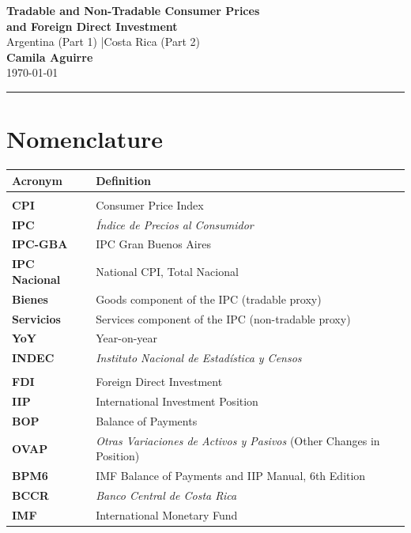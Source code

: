 \documentclass[11pt, a4paper]{article}
\begin{document}

\begin{center}
    {\LARGE\bfseries Tradable and Non-Tradable Consumer Prices\\[4pt]
     and Foreign Direct Investment}\\[8pt]
    {\large Argentina (Part 1) \quad|\quad Costa Rica (Part 2)}\\[6pt]
    {\large\bfseries Camila Aguirre}\\[4pt]
    {\normalsize\color{gray}\today}
\end{center}

\vspace{4pt}
\hrule
\vspace{10pt}

\section*{Nomenclature}

\begin{tabular}{>{\bfseries}p{3.4cm} p{10.8cm}}
    \toprule
    \normalfont\textbf{Acronym} & \textbf{Definition} \\
    \midrule
    \multicolumn{2}{l}{\textit{Part 1 — Argentina}} \\[3pt]
    CPI          & Consumer Price Index \\
    IPC          & \emph{Índice de Precios al Consumidor} \\
    IPC-GBA      & IPC Gran Buenos Aires \\
    IPC Nacional & National CPI, Total Nacional \\
    Bienes       & Goods component of the IPC (tradable proxy) \\
    Servicios    & Services component of the IPC (non-tradable proxy) \\
    YoY          & Year-on-year \\
    INDEC        & \emph{Instituto Nacional de Estadística y Censos} \\[6pt]
    \multicolumn{2}{l}{\textit{Part 2 — Costa Rica}} \\[3pt]
    FDI          & Foreign Direct Investment \\
    IIP          & International Investment Position \\
    BOP          & Balance of Payments \\
    OVAP         & \emph{Otras Variaciones de Activos y Pasivos}
                   (Other Changes in Position) \\
    BPM6         & IMF Balance of Payments and IIP Manual, 6th Edition \\
    BCCR         & \emph{Banco Central de Costa Rica} \\
    IMF          & International Monetary Fund \\
    \bottomrule
\end{tabular}
\end{document}
